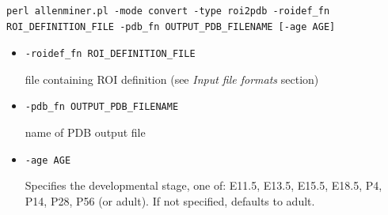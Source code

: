 \documentclass[10pt]{article}
\begin{document}
\begin{lstlisting}
perl allenminer.pl -mode convert -type roi2pdb -roidef_fn ROI_DEFINITION_FILE -pdb_fn OUTPUT_PDB_FILENAME [-age AGE]
\end{lstlisting}

\begin{itemize}
\item {\tt -roidef\_fn ROI\_DEFINITION\_FILE}

file containing ROI definition (see {\it Input file formats} section)

\item {\tt -pdb\_fn OUTPUT\_PDB\_FILENAME}

name of PDB output file

\item {\tt -age AGE}

Specifies the developmental stage, one of: E11.5, E13.5, E15.5, E18.5, P4, P14, P28, P56 (or adult). If not specified, defaults to adult.

\end{itemize}


%
%
%
%
%
%
%
%
%
%
%
%
%
\end{document}
